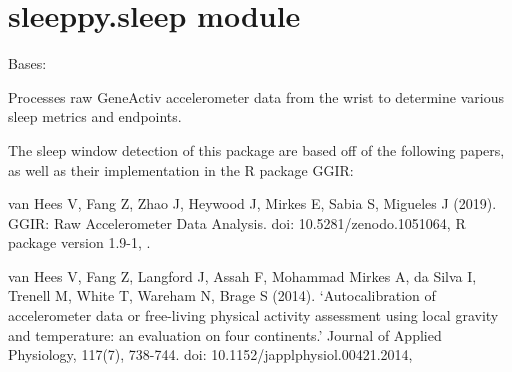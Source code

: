 \documentclass[letterpaper,10pt,english]{sphinxmanual}
\begin{document}
\section{sleeppy.sleep module}
\label{\detokenize{index:module-sleeppy.sleep}}\label{\detokenize{index:sleeppy-sleep-module}}

\begin{fulllineitems}
\label{\detokenize{index:sleeppy.sleep.SleepPy}}
Bases: 

Processes raw GeneActiv accelerometer data from the wrist to determine various sleep metrics and endpoints.


The sleep window detection of this package are based off of the following papers, as
well as their implementation in the R package GGIR:

van Hees V, Fang Z, Zhao J, Heywood J, Mirkes E, Sabia S, Migueles J (2019). GGIR: Raw Accelerometer Data Analysis.
doi: 10.5281/zenodo.1051064, R package version 1.9-1, .

van Hees V, Fang Z, Langford J, Assah F, Mohammad Mirkes A, da Silva I, Trenell M, White T, Wareham N,
Brage S (2014).
‘Autocalibration of accelerometer data or free-living physical activity assessment using local gravity and
temperature: an evaluation on four continents.’ Journal of Applied Physiology, 117(7), 738-744.
doi: 10.1152/japplphysiol.00421.2014, 


\end{fulllineitems}
\end{document}
